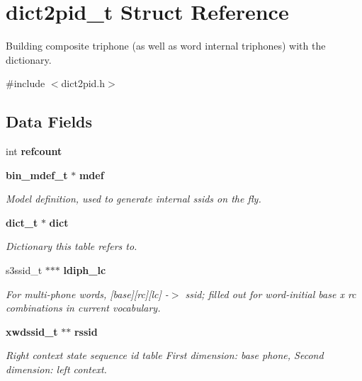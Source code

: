 \section{dict2pid\+\_\+t Struct Reference}
\label{structdict2pid__t}


Building composite triphone (as well as word internal triphones) with the dictionary.  




{\ttfamily \#include $<$dict2pid.\+h$>$}

\subsection*{Data Fields}
\begin{DoxyCompactItemize}
\item 
\mbox{\label{structdict2pid__t_a70dc55b59deb6324c1ef2733b1b25ef1}} 
int {\bfseries refcount}
\item 
\textbf{ bin\+\_\+mdef\+\_\+t} $\ast$ \textbf{ mdef}
\begin{DoxyCompactList}\small\item\em Model definition, used to generate internal ssids on the fly. \end{DoxyCompactList}\item 
\textbf{ dict\+\_\+t} $\ast$ \textbf{ dict}
\begin{DoxyCompactList}\small\item\em Dictionary this table refers to. \end{DoxyCompactList}\item 
\mbox{\label{structdict2pid__t_a609288c1f4cee2ea2e82bc5e391b894a}} 
s3ssid\+\_\+t $\ast$$\ast$$\ast$ \textbf{ ldiph\+\_\+lc}
\begin{DoxyCompactList}\small\item\em For multi-\/phone words, [base][rc][lc] -\/$>$ ssid; filled out for word-\/initial base x rc combinations in current vocabulary. \end{DoxyCompactList}\item 
\mbox{\label{structdict2pid__t_a2cf69a0437b33969d54ef2ae669b90aa}} 
\textbf{ xwdssid\+\_\+t} $\ast$$\ast$ \textbf{ rssid}
\begin{DoxyCompactList}\small\item\em Right context state sequence id table First dimension\+: base phone, Second dimension\+: left context. \end{DoxyCompactList}\item 
\mbox{\label{structdict2pid__t_a4eec4de961e2374a6a4c06bb9dde39d8}} 
$$
\end{DoxyCompactItemize}
